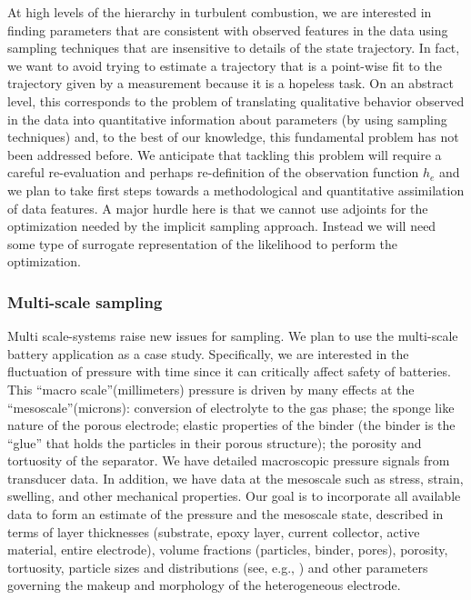 \documentclass[11pt]{article}
\newcommand{\MarginPar}[1]{\marginpar{%
\vskip-\baselineskip %
\raggedright\tiny\sffamily
\hrule\smallskip{\color{red}#1}\par\smallskip\hrule}}
\begin{document}
At high levels of the hierarchy in turbulent combustion, we are interested in finding parameters that are
consistent with observed features in the data using sampling
techniques that are insensitive to details of the state trajectory.
In fact, we want to avoid trying to estimate a trajectory that is a point-wise fit to the trajectory
given by a measurement because it is a hopeless task.
On an abstract level, this corresponds to the problem of translating qualitative behavior observed in the data
into quantitative information about parameters (by using sampling techniques) and, to the best of our knowledge,
this fundamental problem has not been addressed before.
We anticipate that tackling this problem will require a careful re-evaluation and perhaps re-definition of the observation function $h_e$
and we plan to take first steps towards a methodological and quantitative assimilation of data features. 
A major hurdle here is that we cannot use adjoints for the optimization needed by the implicit sampling approach.  Instead we will need
some type of surrogate representation of the likelihood to perform the optimization.

\subsubsection*{Multi-scale sampling}
Multi scale-systems raise new issues for sampling.
We plan to use the multi-scale battery application as a case study.
Specifically, we are interested in the fluctuation of pressure with time since it can critically 
affect safety of batteries.
This ``macro scale''(millimeters) pressure is driven by many effects at the ``mesoscale''(microns):
conversion of electrolyte to the gas phase; the sponge like nature of the porous electrode; elastic properties of the binder (the binder is the ``glue'' that holds the particles in their porous structure); the porosity and tortuosity of the separator.
We have detailed macroscopic pressure signals from transducer data.
In addition, we have data at the mesoscale such as stress, strain, swelling, and other mechanical properties.
Our goal is to incorporate all available data to form an estimate of the pressure and the mesoscale state,
described in terms of layer thicknesses (substrate, epoxy layer, current collector, active material, entire electrode),
volume fractions (particles, binder, pores), porosity, tortuosity, particle sizes and distributions (see, e.g., \cite{Sethuraman2012334})
and other parameters governing the makeup and morphology of the heterogeneous electrode.
\end{document}
